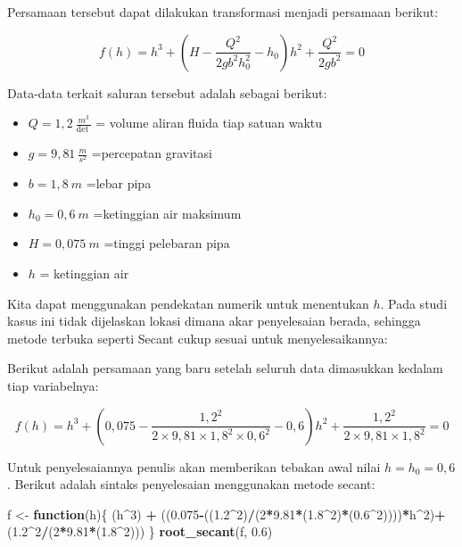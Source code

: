 \documentclass[
]{book}
\newenvironment{Shaded}{\begin{snugshade}}{\end{snugshade}}
\newcommand{\ControlFlowTok}[1]{\textcolor[rgb]{0.13,0.29,0.53}{\textbf{#1}}}
\newcommand{\DecValTok}[1]{\textcolor[rgb]{0.00,0.00,0.81}{#1}}
\newcommand{\FloatTok}[1]{\textcolor[rgb]{0.00,0.00,0.81}{#1}}
\newcommand{\FunctionTok}[1]{\textcolor[rgb]{0.13,0.29,0.53}{\textbf{#1}}}
\newcommand{\NormalTok}[1]{#1}
\newcommand{\OtherTok}[1]{\textcolor[rgb]{0.56,0.35,0.01}{#1}}
\newcommand{\SpecialCharTok}[1]{\textcolor[rgb]{0.81,0.36,0.00}{\textbf{#1}}}
\providecommand{\tightlist}{%
  \setlength{\itemsep}{0pt}\setlength{\parskip}{0pt}}
\theoremstyle{definition}
\theoremstyle{definition}
\theoremstyle{definition}
\theoremstyle{definition}
\theoremstyle{remark}
\begin{document}
Persamaan tersebut dapat dilakukan transformasi menjadi persamaan berikut:

\begin{equation}
f\left(h\right)=h^3+\left(H-\frac{Q^2}{2gb^2h_0^2}-h_0\right)h^2+\frac{Q^2}{2gb^2}=0
  \label{eq:bernoullieq2}
\end{equation}

Data-data terkait saluran tersebut adalah sebagai berikut:

\begin{itemize}
\tightlist
\item
  \(Q=1,2\ \frac{m^3}{\det\ }\) = volume aliran fluida tiap satuan waktu
\item
  \(g=9,81\ \frac{m}{s^2}\) =percepatan gravitasi
\item
  \(b=1,8\ m\) =lebar pipa
\item
  \(h_0=0,6\ m\) =ketinggian air maksimum
\item
  \(H=0,075\ m\) =tinggi pelebaran pipa
\item
  \(h\) = ketinggian air
\end{itemize}

Kita dapat menggunakan pendekatan numerik untuk menentukan \(h\). Pada studi kasus ini tidak dijelaskan lokasi dimana akar penyelesaian berada, sehingga metode terbuka seperti Secant cukup sesuai untuk menyelesaikannya:

Berikut adalah persamaan yang baru setelah seluruh data dimasukkan kedalam tiap variabelnya:

\[
f\left(h\right)=h^3+\left(0,075-\frac{1,2^2}{2\times9,81\times1,8^2\times0,6^2}-0,6\right)h^2+\frac{1,2^2}{2\times9,81\times1,8^2}=0
\]

Untuk penyelesaiannya penulis akan memberikan tebakan awal nilai \(h=h_0=0,6\). Berikut adalah sintaks penyelesaian menggunakan metode secant:

\begin{Shaded}
\begin{Highlighting}[]
\NormalTok{f }\OtherTok{\textless{}{-}} \ControlFlowTok{function}\NormalTok{(h)\{}
\NormalTok{  (h}\SpecialCharTok{\^{}}\DecValTok{3}\NormalTok{) }\SpecialCharTok{+}\NormalTok{ ((}\FloatTok{0.075}\SpecialCharTok{{-}}\NormalTok{((}\FloatTok{1.2}\SpecialCharTok{\^{}}\DecValTok{2}\NormalTok{)}\SpecialCharTok{/}\NormalTok{(}\DecValTok{2}\SpecialCharTok{*}\FloatTok{9.81}\SpecialCharTok{*}\NormalTok{(}\FloatTok{1.8}\SpecialCharTok{\^{}}\DecValTok{2}\NormalTok{)}\SpecialCharTok{*}\NormalTok{(}\FloatTok{0.6}\SpecialCharTok{\^{}}\DecValTok{2}\NormalTok{))))}\SpecialCharTok{*}\NormalTok{h}\SpecialCharTok{\^{}}\DecValTok{2}\NormalTok{)}\SpecialCharTok{+}\NormalTok{ (}\FloatTok{1.2}\SpecialCharTok{\^{}}\DecValTok{2}\SpecialCharTok{/}\NormalTok{(}\DecValTok{2}\SpecialCharTok{*}\FloatTok{9.81}\SpecialCharTok{*}\NormalTok{(}\FloatTok{1.8}\SpecialCharTok{\^{}}\DecValTok{2}\NormalTok{)))}
\NormalTok{\}}
\FunctionTok{root\_secant}\NormalTok{(f, }\FloatTok{0.6}\NormalTok{)}
\end{Highlighting}
\end{Shaded}
\end{document}
